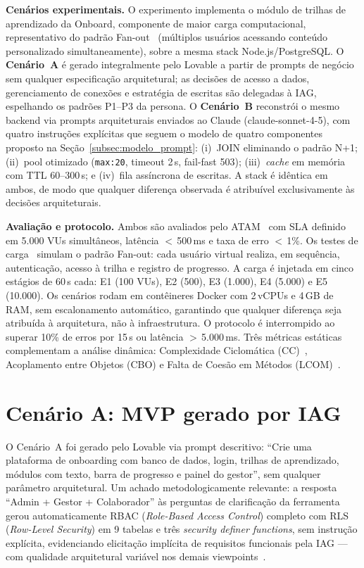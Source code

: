 \documentclass[sigconf]{acmart}
\begin{document}
\textbf{Cenários experimentais.} O experimento implementa o módulo de trilhas de
aprendizado da Onboard, componente de maior carga computacional, representativo do
padrão Fan-out~\cite{Kleppmann2017} (múltiplos usuários acessando conteúdo
personalizado simultaneamente), sobre a mesma stack Node.js/PostgreSQL.
O \textbf{Cenário~A} é gerado integralmente pelo Lovable a partir de prompts de
negócio sem qualquer especificação arquitetural; as decisões de acesso a dados,
gerenciamento de conexões e estratégia de escritas são delegadas à IAG, espelhando
os padrões P1--P3 da persona.
O \textbf{Cenário~B} reconstrói o mesmo backend via prompts arquiteturais enviados
ao Claude (claude-sonnet-4-5), com quatro instruções explícitas que seguem o modelo
de quatro componentes proposto na Seção~\ref{subsec:modelo_prompt}: (i)~JOIN
eliminando o padrão N+1; (ii)~pool otimizado (\texttt{max:20}, timeout 2\,s,
fail-fast 503); (iii)~\textit{cache} em memória com TTL 60--300\,s; e
(iv)~fila assíncrona de escritas. A stack é idêntica em ambos, de modo que qualquer
diferença observada é atribuível exclusivamente às decisões arquiteturais.

\textbf{Avaliação e protocolo.} Ambos são avaliados pelo
ATAM~\cite{Kazman2000} com SLA definido em 5.000 VUs simultâneos, latência
$<$\,500\,ms e taxa de erro $<$\,1\%. Os testes de carga~\cite{grafana2024}
simulam o padrão Fan-out: cada usuário virtual realiza, em sequência, autenticação,
acesso à trilha e registro de progresso. A carga é injetada em cinco estágios de
60\,s cada: E1 (100 VUs), E2 (500), E3 (1.000), E4 (5.000) e E5 (10.000). Os
cenários rodam em contêineres Docker com 2\,vCPUs e 4\,GB de RAM, sem escalonamento
automático, garantindo que qualquer diferença seja atribuída à arquitetura, não à
infraestrutura. O protocolo é interrompido ao superar 10\% de erros por 15\,s ou
latência $>$\,5.000\,ms. Três métricas estáticas complementam a análise dinâmica:
Complexidade Ciclomática (CC)~\cite{McCabe1976}, Acoplamento entre Objetos (CBO)
e Falta de Coesão em Métodos (LCOM)~\cite{Chidamber1994}.

\section{Cenário A: MVP gerado por IAG}

O Cenário~A foi gerado pelo Lovable via prompt descritivo: ``Crie uma plataforma
de onboarding com banco de dados, login, trilhas de aprendizado, módulos com texto,
barra de progresso e painel do gestor'', sem qualquer parâmetro arquitetural.
Um achado metodologicamente relevante: a resposta ``Admin + Gestor + Colaborador''
às perguntas de clarificação da ferramenta gerou automaticamente RBAC
(\textit{Role-Based Access Control}) completo com RLS (\textit{Row-Level Security})
em 9 tabelas e três \textit{security definer functions}, sem instrução explícita,
evidenciando elicitação implícita de requisitos funcionais pela IAG --- com qualidade
arquitetural variável nos demais viewpoints~\cite{ISO25010}.
\end{document}
